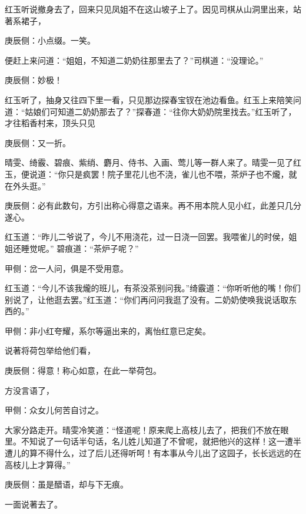 \begin{parag}
    红玉听说撤身去了，回来只见凤姐不在这山坡子上了。因见司棋从山洞里出来，站著系裙子，\begin{note}庚辰侧：小点缀。一笑。\end{note}便赶上来问道：“姐姐，不知道二奶奶往那里去了？”司棋道：“没理论。”\begin{note}庚辰侧：妙极！\end{note}红玉听了，抽身又往四下里一看，只见那边探春宝钗在池边看鱼。红玉上来陪笑问道：“姑娘们可知道二奶奶那去了？”探春道：“往你大奶奶院里找去。”红玉听了，才往稻香村来，顶头只见\begin{note}庚辰侧：又一折。\end{note} 晴雯、绮霰、碧痕、紫绡、麝月、侍书、入画、莺儿等一群人来了。晴雯一见了红玉，便说道：“你只是疯罢！院子里花儿也不浇，雀儿也不喂，茶炉子也不爖，就在外头逛。”\begin{note}庚辰侧：必有此数句，方引出称心得意之语来。再不用本院人见小红，此差只几分遂心。\end{note} 红玉道：“昨儿二爷说了，今儿不用浇花，过一日浇一回罢。我喂雀儿的时侯，姐姐还睡觉呢。” 碧痕道：“茶炉子呢？”\begin{note}甲侧：岔一人问，俱是不受用意。\end{note}红玉道：“今儿不该我爖的班儿，有茶没茶别问我。”绮霰道：“你听听他的嘴！你们别说了，让他逛去罢。”红玉道：“你们再问问我逛了没有。二奶奶使唤我说话取东西的。”\begin{note}甲侧：非小红夸耀，系尔等逼出来的，离怡红意已定矣。\end{note}说著将荷包举给他们看，\begin{note}庚辰侧：得意！称心如意，在此一举荷包。\end{note}方没言语了， \begin{note}甲侧：众女儿何苦自讨之。\end{note}大家分路走开。晴雯冷笑道：“怪道呢！原来爬上高枝儿去了，把我们不放在眼里。不知说了一句话半句话，名儿姓儿知道了不曾呢，就把他兴的这样！这一遭半遭儿的算不得什么，过了后儿还得听呵！有本事从今儿出了这园子，长长远远的在高枝儿上才算得。”\begin{note}庚辰侧：虽是醋语，却与下无痕。\end{note}一面说著去了。
\end{parag}


